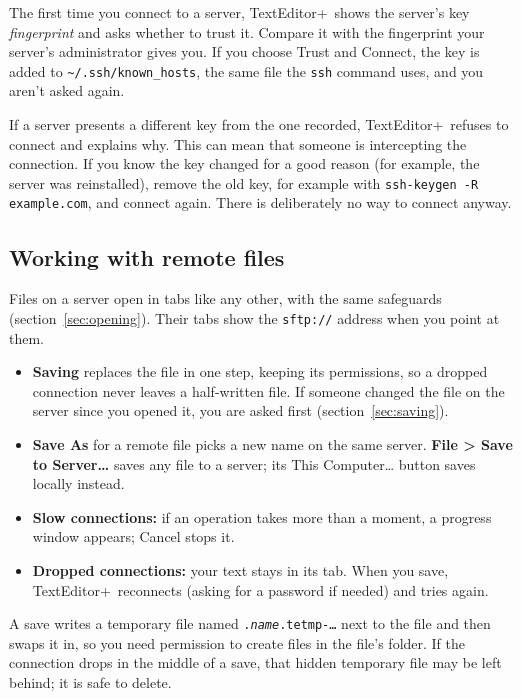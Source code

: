\documentclass[11pt,a4paper]{article}
\newcommand{\appname}{TextEditor+}
\newcommand{\menu}[1]{\textsf{\textbf{#1}}}
\newcommand{\ui}[1]{\textsf{#1}}
\begin{document}
The first time you connect to a server, \appname\ shows the server's key
\emph{fingerprint} and asks whether to trust it. Compare it with the
fingerprint your server's administrator gives you. If you choose \ui{Trust and
Connect}, the key is added to \texttt{\textasciitilde/.ssh/known\_hosts}, the
same file the \texttt{ssh} command uses, and you aren't asked again.

\begin{caution}
If a server presents a different key from the one recorded, \appname\ refuses
to connect and explains why. This can mean that someone is intercepting the
connection. If you know the key changed for a good reason (for example, the
server was reinstalled), remove the old key, for example with
\texttt{ssh-keygen -R example.com}, and connect again. There is deliberately
no way to connect anyway.
\end{caution}

\subsection{Working with remote files}

Files on a server open in tabs like any other, with the same safeguards
(section~\ref{sec:opening}). Their tabs show the \texttt{sftp://} address when
you point at them.

\begin{itemize}
  \item \textbf{Saving} replaces the file in one step, keeping its
        permissions, so a dropped connection never leaves a half-written file.
        If someone changed the file on the server since you opened it, you are
        asked first (section~\ref{sec:saving}).
  \item \textbf{Save As} for a remote file picks a new name on the same
        server. \menu{File > Save to Server…} saves any file to a server; its
        \ui{This Computer…} button saves locally instead.
  \item \textbf{Slow connections:} if an operation takes more than a moment,
        a progress window appears; \ui{Cancel} stops it.
  \item \textbf{Dropped connections:} your text stays in its tab. When you
        save, \appname\ reconnects (asking for a password if needed) and tries
        again.
\end{itemize}

\begin{note}
A save writes a temporary file named \texttt{.\textit{name}.tetmp-\dots} next
to the file and then swaps it in, so you need permission to create files in
the file's folder. If the connection drops in the middle of a save, that hidden
temporary file may be left behind; it is safe to delete.
\end{note}
\end{document}
